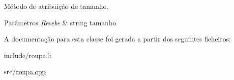 Método de atribuição de tamanho. 


\begin{DoxyParams}{Parâmetros}
{\em Recebe} & string tamanho \\
\hline
\end{DoxyParams}


A documentação para esta classe foi gerada a partir dos seguintes ficheiros\-:\begin{DoxyCompactItemize}
\item 
include/roupa.\-h\item 
src/\hyperlink{roupa_8cpp}{roupa.\-cpp}\end{DoxyCompactItemize}
